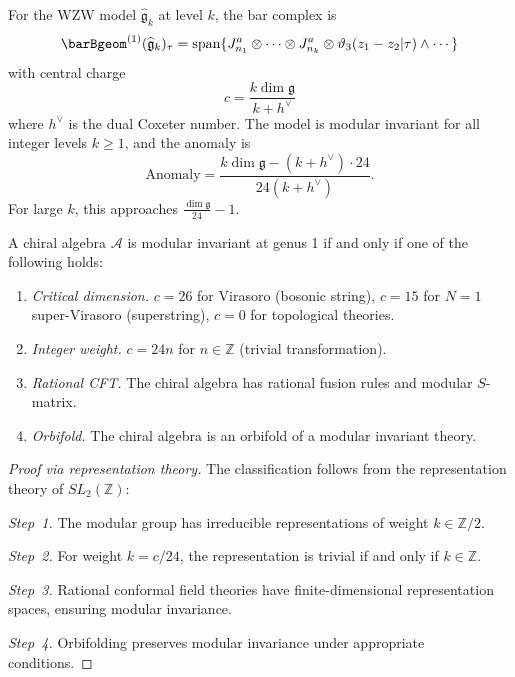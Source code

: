 \begin{example}
For the WZW model $\widehat{\mathfrak{g}}_k$ at level $k$, the bar complex is
\[\barBgeom^{(1)}(\widehat{\mathfrak{g}}_k)_\tau = \text{span}\{J^a_{n_1} \otimes \cdots \otimes J^a_{n_k} \otimes \vartheta_3(z_1-z_2|\tau) \wedge \cdots\}\]
with central charge
\[c = \frac{k \dim \mathfrak{g}}{k + h^\vee}\]
where $h^\vee$ is the dual Coxeter number.
The model is modular invariant for all integer levels $k \geq 1$, and the anomaly is
\[\text{Anomaly} = \frac{k \dim \mathfrak{g} - (k + h^\vee) \cdot 24}{24(k + h^\vee)}.\]
For large $k$, this approaches $\frac{\dim \mathfrak{g}}{24} - 1$.
\end{example}

\begin{theorem}\label{thm:modular-classification}
A chiral algebra $\mathcal{A}$ is modular invariant at genus 1 if and only if one of the following holds:

\begin{enumerate}
\item \emph{Critical dimension.} $c = 26$ for Virasoro (bosonic string), $c = 15$ for $N=1$ super-Virasoro (superstring), $c = 0$ for topological theories.
\item \emph{Integer weight.} $c = 24n$ for $n \in \mathbb{Z}$ (trivial transformation).
\item \emph{Rational CFT.} The chiral algebra has rational fusion rules and modular $S$-matrix.
\item \emph{Orbifold.} The chiral algebra is an orbifold of a modular invariant theory.
\end{enumerate}
\end{theorem}

\begin{proof}[Proof via representation theory]
The classification follows from the representation theory of $SL_2(\mathbb{Z})$:

\emph{Step~1.} The modular group has irreducible representations of weight $k \in \mathbb{Z}/2$.

\emph{Step~2.} For weight $k = c/24$, the representation is trivial if and only if $k \in \mathbb{Z}$.

\emph{Step~3.} Rational conformal field theories have finite-dimensional representation spaces, ensuring modular invariance.

\emph{Step~4.} Orbifolding preserves modular invariance under appropriate conditions.
\end{proof}

